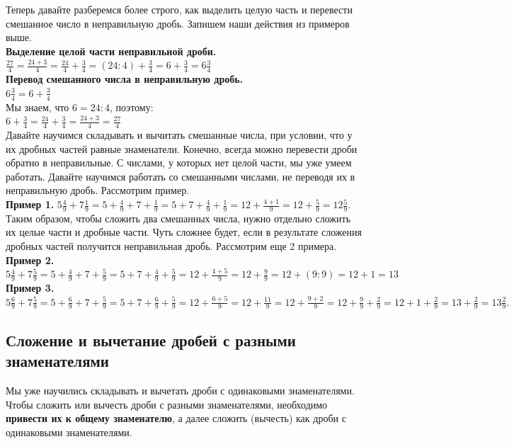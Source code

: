 \documentclass{article}
\begin{document}
Теперь давайте разберемся более строго, как выделить целую часть и перевести смешанное число в неправильную дробь. Запишем наши действия из примеров выше.\\
\textbf{Выделение целой части неправильной дроби.}\\
$\frac{27}4 = \frac{24+3}4 = \frac{24}4 + \frac34 = (24:4) + \frac34 = 6 + \frac34 = 6\frac34$\\
\textbf{Перевод смешанного числа в неправильную дробь.}\\
$6\frac34 = 6 + \frac34$\\
Мы знаем, что $6 = 24:4$, поэтому:\\
$6 + \frac34 = \frac{24}4 + \frac34 = \frac{24+3}4 = \frac{27}4$\\

Давайте научимся складывать и вычитать смешанные числа, при условии, что у их дробных частей равные знаменатели. Конечно, всегда можно перевести дроби обратно в неправильные. С числами, у которых нет целой части, мы уже умеем работать. Давайте научимся работать со смешанными числами, не переводя их в неправильную дробь. Рассмотрим пример.\\

\textbf{Пример 1.} $5\frac49 + 7\frac19 = 5 + \frac49 + 7 + \frac19 = 5 + 7 + \frac49 + \frac19 = 12 + \frac{4+1}9 = 12 + \frac59 = 12\frac59$.\\
Таким образом, чтобы сложить два смешанных числа, нужно отдельно сложить их целые части и дробные части. Чуть сложнее будет, если в результате сложения дробных частей получится неправильная дробь. Рассмотрим еще 2 примера.\\

\textbf{Пример 2.} $5\frac49 + 7\frac59 = 5 + \frac49 + 7 + \frac59 = 5 + 7 + \frac49 + \frac59 = 12 + \frac{4+5}9 = 12 + \frac99 = 12 + (9:9) = 12 + 1 = 13$\\

\textbf{Пример 3.} $5\frac69 + 7\frac59 = 5 + \frac69 + 7 + \frac59 = 5 + 7 + \frac69 + \frac59 = 12 + \frac{6+5}9 = 12 + \frac{11}9 = 12 + \frac{9+2}9 = 12 + \frac99 + \frac29 = 12 + 1 +\frac29 = 13 + \frac29 = 13\frac29.$\\


\subsection{Сложение и вычетание дробей с разными знаменателями}

Мы уже научились складывать и вычетать дроби с одинаковыми знаменателями. Чтобы сложить или вычесть дроби с разными знаменателями, необходимо \textbf{привести их к общему знаменателю}, а далее сложить (вычесть) как дроби с одинаковыми знаменателями.\\
\end{document}
